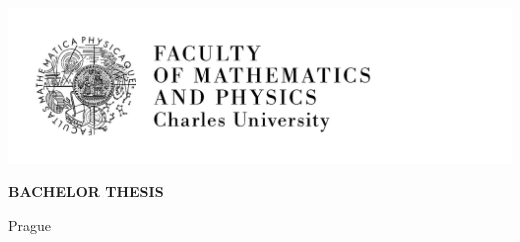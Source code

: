 \pagestyle{empty}
\hypersetup{pageanchor=false}
\begin{center}

\centerline{\mbox{\includegraphics[width=166mm]{../img/logo-en.pdf}}}

\vspace{-8mm}
\vfill

{\bf\Large BACHELOR THESIS}

\vfill

{\LARGE\ThesisAuthor}

\vspace{15mm}

{\LARGE\bfseries\ThesisTitle}

\vfill

\Department

\vfill

{
\centerline{\vbox{}}}

\vfill

Prague \YearSubmitted

\end{center}

